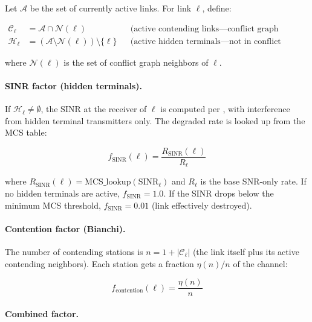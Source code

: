\documentclass[11pt,letterpaper]{article}
\begin{document}
Let $\mathcal{A}$ be the set of currently active links.  For link $\ell$,
define:

\begin{align}
\mathcal{C}_\ell &= \mathcal{A} \cap \mathcal{N}(\ell)
  && \text{(active contending links---conflict graph neighbors)} \label{eq:contending} \\
\mathcal{H}_\ell &= (\mathcal{A} \setminus \mathcal{N}(\ell)) \setminus \{\ell\}
  && \text{(active hidden terminals---not in conflict graph)} \label{eq:hidden}
\end{align}

where $\mathcal{N}(\ell)$ is the set of conflict graph neighbors of $\ell$.

\paragraph{SINR factor (hidden terminals).}
If $\mathcal{H}_\ell \neq \emptyset$, the SINR at the receiver of $\ell$ is
computed per , with interference from hidden terminal
transmitters only.  The degraded rate is looked up from the MCS table:

\begin{equation}
\label{eq:sinr_factor}
f_\text{SINR}(\ell) = \frac{R_\text{SINR}(\ell)}{R_\ell}
\end{equation}

where $R_\text{SINR}(\ell) = \text{MCS\_lookup}(\text{SINR}_\ell)$ and
$R_\ell$ is the base SNR-only rate.  If no hidden terminals are active,
$f_\text{SINR} = 1.0$.  If the SINR drops below the minimum MCS threshold,
$f_\text{SINR} = 0.01$ (link effectively destroyed).

\paragraph{Contention factor (Bianchi).}
The number of contending stations is $n = 1 + |\mathcal{C}_\ell|$ (the link
itself plus its active contending neighbors).  Each station gets a fraction
$\eta(n)/n$ of the channel:

\begin{equation}
\label{eq:contention_factor}
f_\text{contention}(\ell) = \frac{\eta(n)}{n}
\end{equation}

\paragraph{Combined factor.}
\end{document}
